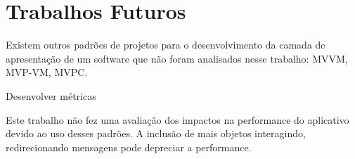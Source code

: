 \section{Trabalhos Futuros}

Existem outros padrões de projetos para o desenvolvimento da camada de
apresentação de um software que não foram analisados nesse trabalho: MVVM,
MVP-VM, MVPC.

Desenvolver métricas


Este trabalho não fez uma avaliação dos impactos na performance do aplicativo
devido ao uso desses padrões. A inclusão de mais objetos interagindo,
redirecionando mensagens pode depreciar a performance.
